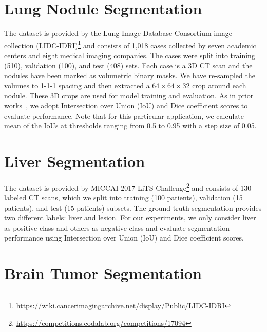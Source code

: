 \section*{Lung Nodule Segmentation}
\label{ap1:lung_nodule_segmentation}

The dataset is provided by the Lung Image Database Consortium image collection (LIDC-IDRI)\footnote{\href{https://wiki.cancerimagingarchive.net/display/Public/LIDC-IDRI}{https://wiki.cancerimagingarchive.net/display/Public/LIDC-IDRI}}\citep{armato2011lung} and consists of 1,018 cases collected by seven academic centers and eight medical imaging companies. The cases were split into training (510), validation (100), and test (408) sets. Each case is a 3D CT scan and the nodules have been marked as volumetric binary masks. We have re-sampled the volumes to 1-1-1 spacing and then extracted a $64\times 64\times 32$ crop around each nodule. These 3D crops are used for model training and evaluation. As in prior works~\citep{aresta2019iw,tang2019nodulenet,zhou2018unet++}, we adopt Intersection over Union (IoU) and Dice coefficient scores to evaluate performance. Note that for this particular application, we calculate mean of the IoUs at thresholds ranging from 0.5 to 0.95 with a step size of 0.05.

\section*{Liver Segmentation}
\label{ap1:liver_segmentation}

The dataset is provided by MICCAI 2017 LiTS Challenge\footnote{\href{https://competitions.codalab.org/competitions/17094}{https://competitions.codalab.org/competitions/17094}} and consists of 130 labeled CT scans, which we split into training (100 patients), validation (15 patients), and test (15 patients) subsets. The ground truth segmentation provides two different labels: liver and lesion. For our experiments, we only consider liver as positive class and others as negative class and evaluate segmentation performance using Intersection over Union (IoU) and Dice coefficient scores.

\section*{Brain Tumor Segmentation}
\label{ap1:brain_tumor_segmentation}

